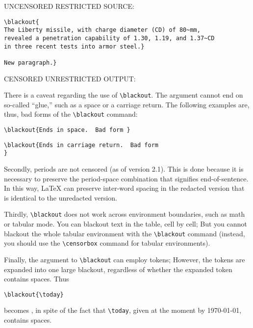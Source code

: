 \documentclass{article}
\begin{document}
{\addtolength{\leftskip}{2.3em}
UNCENSORED RESTRICTED SOURCE: \hrulefill


\verb|\blackout{|\\
\verb|The Liberty missile, with charge diameter (CD) of 80~mm,|\\
\verb|revealed a penetration capability of 1.30, 1.19, and 1.37~CD|\\
\verb|in three recent tests into armor steel.}|\\
\verb| |\\
\verb|New paragraph.}|

CENSORED UNRESTRICTED OUTPUT: \hrulefill


\hrulefill

}

There is a caveat regarding the use of \verb|\blackout|.  
The argument cannot end on so-called ``glue,'' such as a space
or a carriage return.  The following examples are, thus, bad forms of
the \verb|\blackout| command:

\verb|\blackout{Ends in space.  Bad form }|

\verb|\blackout{Ends in carriage return.  Bad form|\\
\verb|}|

Secondly, periods are not censored (as of version 2.1).  This is done
because it is necessary to preserve the period-space combination that
signifies end-of-sentence.  In this way, {\LaTeX} can preserve
inter-word spacing in the redacted version that is identical to the
unredacted version.

Thirdly, \verb|\blackout| does not work across environment boundaries,
such as math or tabular mode.  You can blackout text in the table, cell
by cell; But you cannot blackout the whole tabular environment with the
\verb|\blackout| command (instead, you should use the \verb|\censorbox|
command for tabular environments).

Finally, the argument to \verb|\blackout| can employ tokens; However,
the tokens are expanded into one large blackout, regardless of whether
the expanded token contains spaces.  Thus

\verb|\blackout{\today}|

becomes \blackout{\today}, in spite of the fact that \verb|\today|,
given at the moment by \today, contains spaces.
\end{document}

